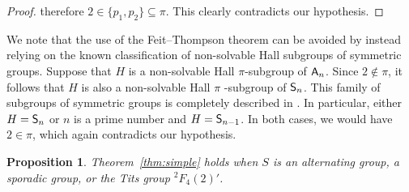 \documentclass[12pt]{amsart}
\newtheorem{proposition}[theorem]{Proposition}
\theoremstyle{definition}
\numberwithin{equation}{section}
\newcommand{\Irr}{{\mathrm {Irr}}}
\newcommand{\QQ}{{\mathbb Q}}
\newcommand{\ZZ}{{\mathbb Z}}
\newcommand{\Al}{\textup{\textsf{A}}}
\newcommand{\Sy}{\textup{\textsf{S}}}
\begin{document}
\begin{proof}
therefore $2\in
\{p_1,p_2\}\subseteq \pi$. %
This clearly contradicts our hypothesis.
%
%
\end{proof}




We note that the use of the Feit--Thompson theorem can be avoided by
instead relying on the known classification of non-solvable Hall
subgroups of symmetric groups. Suppose that $H$ is a non-solvable
Hall $\pi$-subgroup of $\Al_n$. Since $2 \notin \pi$, it follows
that $H$ is also a %
non-solvable Hall $\pi$%
-subgroup of $\Sy_n$. This
family of subgroups of symmetric groups is completely described in
\cite{Thompson}. In particular, either $H = \Sy_n$ or $n$ is a prime
number and $H = \Sy_{n-1}$. In both cases, we would have $2 \in
\pi$, which again contradicts our hypothesis.



\begin{proposition}\label{prop:alternatingandsporadic}
Theorem~\ref{thm:simple} holds when $S$ is an alternating group, a
sporadic group, or the %
Tits group ${}^2F_4(2)'$.
\end{proposition}
\end{document}
